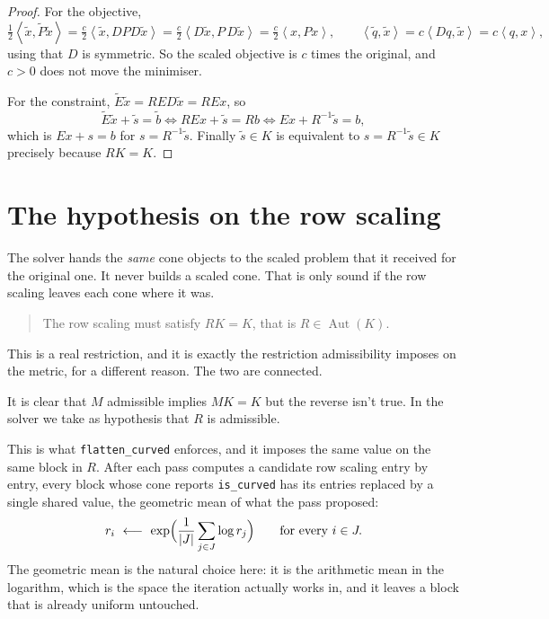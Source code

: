 \documentclass[a4paper,11pt]{book}
\theoremstyle{plain}
\theoremstyle{definition}
\theoremstyle{remark}
\numberwithin{equation}{chapter}
\numberwithin{algorithm}{chapter}
\newcommand{\inner}[2]{\left\langle #1, #2 \right\rangle}
\newcommand{\Aut}{\operatorname{Aut}}
\begin{document}
	\begin{proof}
		For the objective,
		\[
		\tfrac12\inner{\widetilde x}{\widetilde P\widetilde x}
		=\tfrac{c}{2}\inner{\widetilde x}{DPD\widetilde x}
		=\tfrac{c}{2}\inner{D\widetilde x}{P\,D\widetilde x}
		=\tfrac{c}{2}\inner{x}{Px},
		\qquad
		\inner{\widetilde q}{\widetilde x}
		=c\inner{Dq}{\widetilde x}
		=c\inner{q}{x} ,
		\]
		using that $D$ is symmetric. So the scaled objective is $c$ times the
		original, and $c>0$ does not move the minimiser.

		For the constraint, $\widetilde E\widetilde x=RED\widetilde x=REx$, so
		\[
		\widetilde E\widetilde x+\widetilde s=\widetilde b
		\iff
		REx+\widetilde s=Rb
		\iff
		Ex+R^{-1}\widetilde s=b ,
		\]
		which is $Ex+s=b$ for $s=R^{-1}\widetilde s$. Finally $\widetilde s\in K$
		is equivalent to $s=R^{-1}\widetilde s\in K$ precisely because $RK=K$.
	\end{proof}

	

	\section{The hypothesis on the row scaling}

	The solver hands the \emph{same} cone objects to the scaled problem that it
	received for the original one. It never builds a scaled cone. That is only
	sound if the row scaling leaves each cone where it was.

	\begin{quote}
		The row scaling must satisfy $RK=K$, that is $R\in\Aut(K)$.
	\end{quote}

	This is a real restriction, and it is exactly the restriction admissibility
	imposes on the metric, for a different reason. The two are connected.

    It is clear that $M$ admissible implies $MK = K$ but the reverse isn't true. In the solver we take as hypothesis that $R$ is admissible.


	
	This is what \texttt{flatten\_curved} enforces, and it imposes the same value on the same block in $R$. After each pass computes a candidate row scaling
	entry by entry, every block whose cone reports \texttt{is\_curved} has its
	entries replaced by a single shared value, the geometric mean of what the
	pass proposed:
	\[
	r_i\ \longleftarrow\ \exp\Bigl(\frac1{|J|}\sum_{j\in J}\log r_j\Bigr)
	\qquad\text{for every }i\in J .
	\]
	The geometric mean is the natural choice here: it is the arithmetic mean in
	the logarithm, which is the space the iteration actually works in, and it
	leaves a block that is already uniform untouched.
\end{document}
